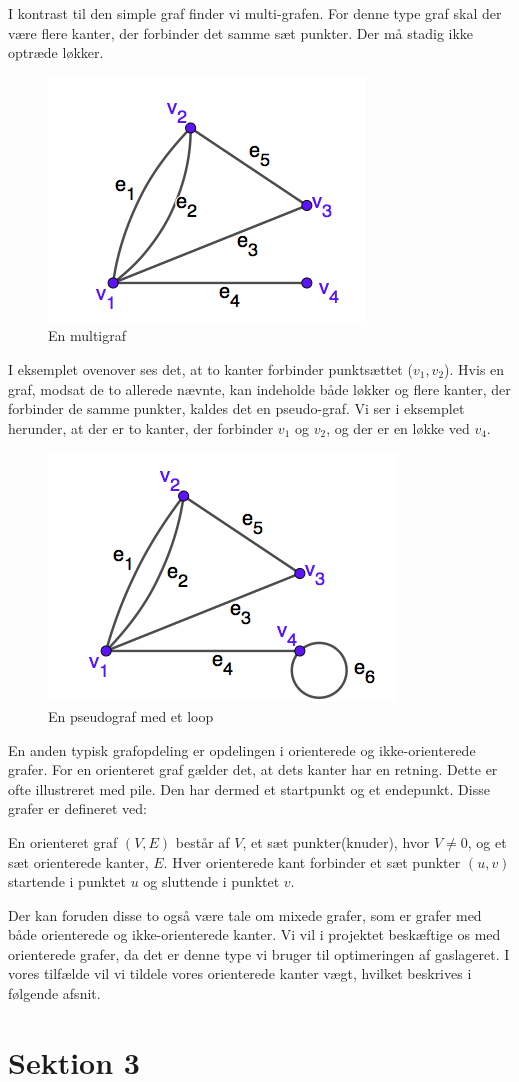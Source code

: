 I kontrast til den simple graf finder vi multi-grafen. For denne type graf skal der være flere kanter, der forbinder det samme sæt punkter. Der må stadig ikke optræde løkker.
\begin{figure}[H]
\centering
\includegraphics[scale=0.5]{fig/img/multigraf.png} 
\caption{En multigraf}
\label{fig:multi}
\end{figure}
I eksemplet ovenover ses det, at to kanter forbinder punktsættet ($v_{1},v_{2}$). Hvis en graf, modsat de to allerede nævnte, kan indeholde både løkker og flere kanter, der forbinder de samme punkter, kaldes det en pseudo-graf. Vi ser i eksemplet herunder, at der er to kanter, der forbinder $v_{1}$ og $v_{2}$, og der er en løkke ved $v_{4}$.
\begin{figure}[H]
\centering
\includegraphics[scale=0.5]{fig/img/pseudograf.png}
\caption{En pseudograf med et loop}
\label{fig:pseudo}
\end{figure}
En anden typisk grafopdeling er opdelingen i orienterede og ikke-orienterede grafer. For en orienteret graf gælder det, at dets kanter har en retning. Dette er ofte illustreret med pile. Den har dermed et startpunkt og et endepunkt. Disse grafer er defineret ved:
\begin{definition}
En orienteret graf $(V,E)$ består af $V$, et sæt punkter(knuder), hvor $V\neq0$, og et sæt orienterede kanter, $E$. Hver orienterede kant forbinder et sæt punkter $(u,v)$ startende i punktet $u$ og sluttende i punktet $v$.
\end{definition}
Der kan foruden disse to også være tale om mixede grafer, som er grafer med både orienterede og ikke-orienterede kanter. Vi vil i projektet beskæftige os med orienterede grafer, da det er denne type vi bruger til optimeringen af gaslageret. I vores tilfælde vil vi tildele vores orienterede kanter vægt, hvilket beskrives i følgende afsnit.




\section{Sektion 3}
